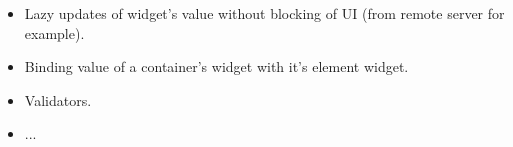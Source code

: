 \documentclass[a4paper]{article}
\begin{document}
\begin{itemize}
\item Lazy updates of widget's value without blocking of UI (from remote server for example).
\item Binding value of a container's widget with it's element widget.
\item Validators.
\item ...
\end{itemize}
\begin{comment}
\subsubsection{gmapT}
This function executes a generic function for each member of any object 
Only one direct sub-level is traversed.
The function is implemented by means of gfoldl but it's used more often.
\paragraph{gmapTCopy}
Analogues to gmapQ but it copies all objects along with traversal, so parameter object is unchanged.
\paragraph{gmapQ}

\paragraph{everywhere}
Generic function which executes generic function passed to it as parameter for each sub member of specified object recursively.
It defers from gmapT which traverses only one level.
Actually the function is analogues to familiar OOP Visitor pattern.

\paragraph{everywhereCopy}
Generic function which executes generic function passed to it as parameter for each sub member of specified object recursively.
It defers from gmapT which traverses only one level.
Actually the function is analogues to familiar OOP Visitor pattern.

\paragraph{everywhereBut}

The function is similar to everwhere but it has additional predicate which asks the library to stop traversal.


\end{comment}
\end{document}
